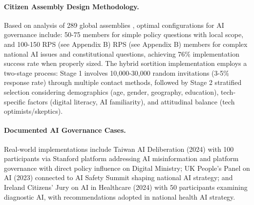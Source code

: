 \documentclass[manuscript,screen,9pt]{acmart}
\begin{document}
\paragraph{Citizen Assembly Design Methodology.} Based on analysis of 289 global assemblies \cite{OECD2020CitizenParticipation}, optimal configurations for AI governance include: 50-75 members for simple policy questions with local scope, and 100-150 RPS\cite{perf-report} (see Appendix B) RPS\cite{perf-report} (see Appendix B) members for complex national AI issues and constitutional questions, achieving 76\% implementation success rate when properly sized. The hybrid sortition implementation employs a two-stage process: Stage 1 involves 10,000-30,000 random invitations (3-5\% response rate) through multiple contact methods, followed by Stage 2 stratified selection considering demographics (age, gender, geography, education), tech-specific factors (digital literacy, AI familiarity), and attitudinal balance (tech optimists/skeptics).

\paragraph{Documented AI Governance Cases.} Real-world implementations include Taiwan AI Deliberation (2024) with 100 participants via Stanford platform addressing AI misinformation and platform governance with direct policy influence on Digital Ministry; UK People's Panel on AI (2023) connected to AI Safety Summit shaping national AI strategy; and Ireland Citizens' Jury on AI in Healthcare (2024) with 50 participants examining diagnostic AI, with recommendations adopted in national health AI strategy.
\end{document}
